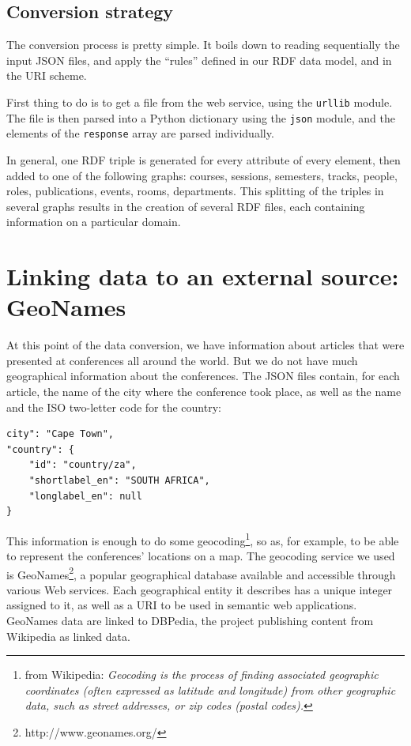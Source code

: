 \documentclass[a4paper,11pt]{report}
\begin{document}
\subsection{Conversion strategy}
The conversion process is pretty simple. It boils down to reading sequentially the input JSON files, and apply the ``rules'' defined in our RDF data model, and in the URI scheme. 

First thing to do is to get a file from the web service, using the \texttt{urllib} module. The file is then parsed into a Python dictionary using the \texttt{json} module, and the elements of the \texttt{response} array are parsed individually. 

In general, one RDF triple is generated for every attribute of every element, then added to one of the following graphs: courses, sessions, semesters, tracks, people, roles, publications, events, rooms, departments. This splitting of the triples in several graphs results in the creation of several RDF files, each containing information on a particular domain. 

\section{Linking data to an external source: GeoNames}
At this point of the data conversion, we have information about articles that were presented at conferences all around the world. But we do not have much geographical information about the conferences. The JSON files contain, for each article, the name of the city where the conference took place, as well as the name and the ISO two-letter code for the country:
\begin{Verbatim}[xleftmargin=3em]
city": "Cape Town",
"country": {
    "id": "country/za",
    "shortlabel_en": "SOUTH AFRICA",
    "longlabel_en": null
}
\end{Verbatim}

This information is enough to do some geocoding\footnote{from Wikipedia: \emph{Geocoding is the process of finding associated geographic coordinates (often expressed as latitude and longitude) from other geographic data, such as street addresses, or zip codes (postal codes). }}, so as, for example, to be able to represent the conferences' locations on a map. The geocoding service we used is GeoNames\footnote{http://www.geonames.org/}, a popular geographical database available and accessible through various Web services. Each geographical entity it describes has a unique integer assigned to it, as well as a URI to be used in semantic web applications. GeoNames data are linked to DBPedia, the project publishing content from Wikipedia as linked data. 
\end{document}
